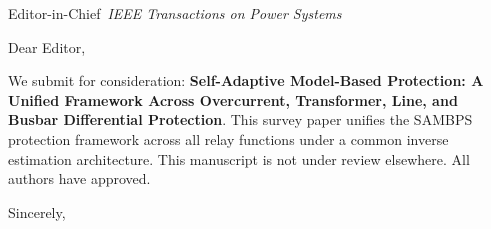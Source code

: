 \documentclass[11pt,a4paper]{letter}
\begin{document}
\begin{letter}{Editor-in-Chief\ \textit{IEEE Transactions on Power Systems}}
\opening{Dear Editor,}
We submit for consideration: \textbf{Self-Adaptive Model-Based Protection: A Unified Framework Across Overcurrent, Transformer, Line, and Busbar Differential Protection}.
This survey paper unifies the SAMBPS protection framework across all relay functions under a common inverse estimation architecture.
This manuscript is not under review elsewhere. All authors have approved.
\closing{Sincerely,}
\end{letter}
\end{document}

